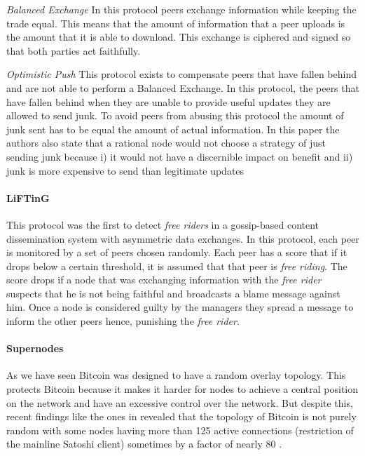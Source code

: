 \textit{Balanced Exchange} In this protocol peers exchange information while keeping the trade equal. This means that the amount of information that a peer uploads is the amount that it is able to download. This exchange is ciphered and signed so that both parties act faithfully.

\textit{Optimistic Push} This protocol exists to compensate peers that have fallen behind and are not able to perform a Balanced Exchange. In this protocol, the peers that have fallen behind when they are unable to provide useful updates they are allowed to send junk. To avoid peers from abusing this protocol the amount of junk sent has to be equal the amount of actual information. In this paper the authors also state that a rational node would not choose a strategy of just sending junk because i) it would not have a discernible impact on benefit and ii) junk is more expensive to send than legitimate updates

\paragraph*{\textbf{LiFTinG} \cite{guerraoui2010lifting}}
This protocol was the first to detect \textit{free riders} in a gossip-based content dissemination system with asymmetric data exchanges.
In this protocol, each peer is monitored by a set of peers chosen randomly. Each peer has a score that if it drops below a certain threshold, it is assumed that that peer is \textit{free riding}. The score drops if a node that was exchanging information with the \textit{free rider} suspects that he is not being faithful and broadcasts a blame message against him. Once a node is considered guilty by the managers they spread a message to inform the other peers hence, punishing the \textit{free rider}.

\paragraph*{\textbf{Supernodes}} As we have seen Bitcoin was designed to have a random overlay topology. This protects Bitcoin because it makes it harder for nodes to achieve a central position on the network and have an excessive control over the network. But despite this, recent findings like the ones in \cite{miller2015discovering} revealed that the topology of Bitcoin is not purely random with some nodes having more than 125 active connections (restriction of the mainline Satoshi client) sometimes by a factor of nearly 80 \cite{miller2015discovering}.

